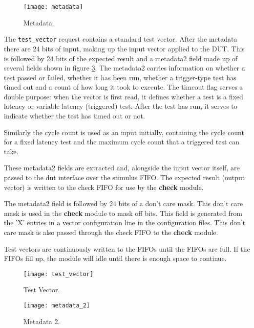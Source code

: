 \begin{figure}[h]
 \centering
 \texttt{[image: metadata]}
 \caption{Metadata.}
 \label{fig:req_metadata}
\end{figure}

The \texttt{test\_vector} request contains a standard test vector. After the metadata there are 24 bits of input, making up
the input vector applied to the DUT. This is followed by 24 bits of the expected result and a metadata2 field made up of
several fields shown in figure \ref{fig:req_metadata_2}. The metadata2 carries information on whether a test passed or failed,
whether it has been run, whether a trigger-type test has timed out and a count of how long it took to execute.
The timeout flag serves a double purpose: when the vector is first read, it defines whether a test
is a fixed latency or variable latency (triggered) test. After the test has run, it serves to indicate whether the test has timed out or not.

Similarly the cycle count is used as an input initially, containing the cycle count for a fixed latency test and the maximum cycle
count that a triggered test can take.

These metadata2 fields are extracted and, alongside the input vector itself, are passed to the dut interface over the stimulus FIFO.
The expected result (output vector) is written to the check FIFO for use by the \textbf{check} module.

The metadata2 field is followed by 24 bits of a don't care mask. This don't care mask is used in the \textbf{check} module to
mask off bits. This field is generated from the 'X' entries in a vector configuration line in the configuration files. This don't care
mask is also passed through the check FIFO to the \textbf{check} module.

Test vectors are continuously written to the FIFOs until the FIFOs are full. If the FIFOs fill up, the module will idle
until there is enough space to continue.

\begin{figure}[h]
 \centering
 \texttt{[image: test\_vector]}
 \caption{Test Vector.}
 \label{fig:req_test_vector}
\end{figure}

\begin{figure}[h]
 \centering
 \texttt{[image: metadata\_2]}
 \caption{Metadata 2.}
 \label{fig:req_metadata_2}
\end{figure}


